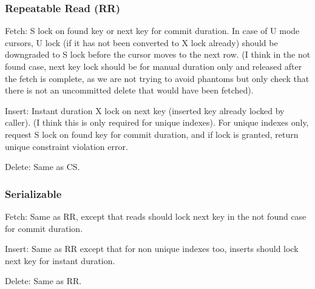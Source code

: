 \documentclass[a4paper,draft,oneside]{book}
\begin{document}
\subsubsection{Repeatable Read (RR)}

Fetch: S lock on found key or next key for commit duration. In case of U mode cursors, U lock (if it has not been converted to X lock already) should be downgraded to S lock before the cursor moves to the next row. (I think in the not found case, next key lock should be for manual duration only and released after the fetch is complete, as we are not trying to avoid phantoms but only check that there is not an uncommitted delete that would have been fetched). 

Insert: Instant duration X lock on next key (inserted key already locked by caller). (I think this is only required for unique indexes). For unique indexes only, request S lock on found key for commit duration, and if lock is granted, return unique constraint violation error. 

Delete: Same as CS. 

\subsubsection{Serializable}
Fetch: Same as RR, except that reads should lock next key in the not found case for commit duration. 

Insert: Same as RR except that for non unique indexes too, inserts should lock next key for instant duration. 

Delete: Same as RR. 
\end{document}

